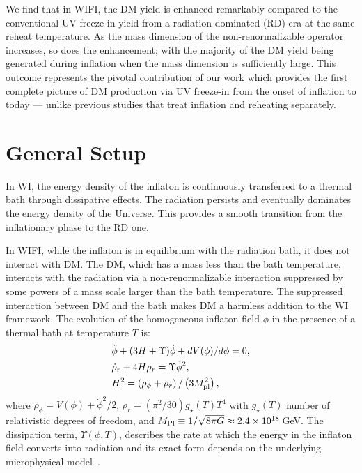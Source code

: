 We find that in WIFI, the DM yield is enhanced remarkably
compared to the conventional UV freeze-in yield from
a radiation dominated (RD) era at the same reheat temperature. As the mass dimension of the non-renormalizable operator increases, so does the enhancement; with the majority of the DM yield being generated during inflation when the mass dimension is sufficiently large. This outcome represents the pivotal contribution of our work which  provides the first complete picture of DM production via UV
freeze-in from the onset of inflation to today --- unlike previous studies that treat inflation and reheating separately.


\section{General Setup}
\label{sec:ch6-model}

In WI, the energy density of the inflaton is continuously transferred to a thermal bath through dissipative effects.  The radiation persists and eventually dominates the energy density of the Universe. This provides a smooth transition from the inflationary phase to the RD one.

In WIFI, while the inflaton
is in equilibrium with the radiation bath, it does not interact with DM. The DM, which has a mass less than the bath temperature, interacts with the radiation via a non-renormalizable interaction suppressed by some powers of a mass scale larger than the bath temperature. The suppressed interaction between DM and the bath makes DM a harmless addition to the WI framework. The evolution of the homogeneous inflaton
field $\phi$ in the presence of a thermal bath at temperature $T$ is:
\begin{align}
    &\ddot{\phi}+(3H+\Upsilon)\dot{\phi}+dV(\phi)/d\phi=0,\label{eq:ch6-inflaton} \\
    & \dot{\rho}_r+4H\rho_r=\Upsilon \dot{\phi}^2,\label{eq:ch6-rhor} \\
    & H^2=\left(\rho_\phi+\rho_r\right)/\left(3 M_{\rm{pl}}^2\right),\label{eq:ch6-Hubble}
\end{align}
where $\rho_\phi=V(\phi)+\dot{\phi}^2/2$, $\rho_r=(\pi^2/30)g_\star(T)T^4$ with $g_\star(T)$ number of relativistic degrees of freedom, and $M_{\rm{Pl}}\equiv 1/\sqrt{8\pi G}\approx 2.4 \times 10^{18}\,$GeV.
 The dissipation term, $\Upsilon(\phi,T)$, describes the rate at which the energy in the inflaton field converts into radiation and its exact form depends on the underlying microphysical model~\cite{Berera:1998px}.

